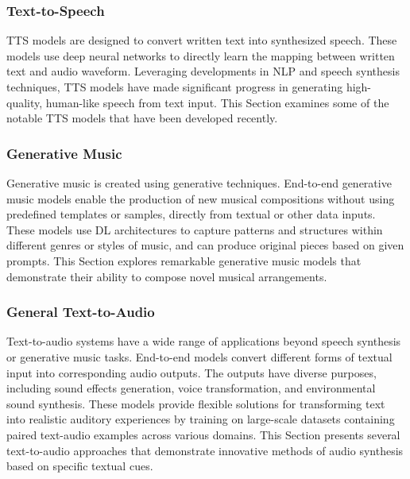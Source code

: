 
\subsubsection{Text-to-Speech} \label{sec:tts}

\Acf{TTS} models are designed to convert written text into synthesized speech. These models use deep neural networks to directly learn the mapping between written text and audio waveform. Leveraging developments in \ac{NLP} and speech synthesis techniques, \ac{TTS} models have made significant progress in generating high-quality, human-like speech from text input. This Section examines some of the notable \ac{TTS} models that have been developed recently.




\subsubsection{Generative Music}

Generative music is created using generative techniques. End-to-end generative music models enable the production of new musical compositions without using predefined templates or samples, directly from textual or other data inputs. These models use \ac{DL} architectures to capture patterns and structures within different genres or styles of music, and can produce original pieces based on given prompts. This Section explores remarkable generative music models that demonstrate their ability to compose novel musical arrangements.





\subsubsection{General Text-to-Audio}

Text-to-audio systems have a wide range of applications beyond speech synthesis or generative music tasks. End-to-end models convert different forms of textual input into corresponding audio outputs. The outputs have diverse purposes, including sound effects generation, voice transformation, and environmental sound synthesis. These models provide flexible solutions for transforming text into realistic auditory experiences by training on large-scale datasets containing paired text-audio examples across various domains. This Section presents several text-to-audio approaches that demonstrate innovative methods of audio synthesis based on specific textual cues.







